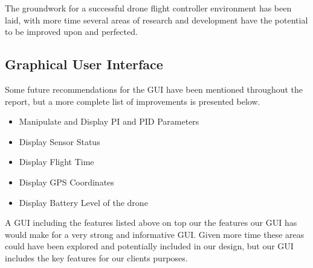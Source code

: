 The groundwork for a successful drone flight controller environment has been laid, with more time several areas of research and development have the potential to be improved upon and perfected.


\subsection{Graphical User Interface}
Some future recommendations for the GUI have been mentioned throughout the report, but a more complete list of improvements is presented below. 

\begin{itemize}
	\item Manipulate and Display PI and PID Parameters
	\item Display Sensor Status
	\item Display Flight Time
	\item Display GPS Coordinates
	\item Display Battery Level of the drone
\end{itemize}

A GUI including the features listed above on top our the features our GUI has would make for a very strong and informative GUI. Given more time these areas could have been explored and potentially included in our design, but our GUI includes the key features for our clients purposes.
